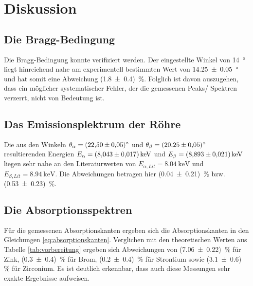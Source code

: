 \section{Diskussion}

\subsection{Die Bragg-Bedingung}
Die Bragg-Bedingung konnte verifiziert werden.
Der eingestellte Winkel von \qty[]{14}{\degree} liegt hinreichend nahe am experimentell bestimmten Wert von \qty{14.25+-0.05}{\degree}
und hat somit eine Abweichung (\num[]{1.8 +- 0.4}) \,\%.
Folglich ist davon auszugehen, dass ein möglicher systematischer Fehler, der die gemessenen Peaks/ Spektren verzerrt, nicht von Bedeutung ist.


\subsection{Das Emissionsplektrum der Röhre}
Die aus den Winkeln $\theta_\alpha = \qty{22.50 \pm 0.05}{\degree}$ und $\theta_\beta = \qty{20.25 \pm 0.05}{\degree}$
 resultierenden Energien $E_\alpha = \qty{8.043 \pm 0.017}{\kilo\eV}$ und $E_\beta  = \qty{8.893 \pm 0.021}{\kilo\eV}$
liegen sehr nahe an den Literaturwerten von $E_{\alpha,Lit} = \qty[]{8.04}{\kilo\electronvolt}$ und
$E_{\beta,Lit} = \qty[]{8.94}{\kilo\electronvolt}$.
Die Abweichungen betragen hier (\num[]{0.04 +- 0.21}) \,\% bzw. (\num[]{0.53 +- 0.23}) \,\%.



\subsection{Die Absorptionsspektren}
Für die gemessenen Absorptionskanten ergeben sich die Absorptionskanten in den Gleichungen \eqref{eq:absorptionskanten}.
Verglichen mit den theoretischen Werten aus Tabelle \ref{tab:vorbereitung} ergeben sich Abweichungen von (\num[]{7.06 +- 0.22}) \,\% für Zink,
(\num[]{0.3 +- 0.4}) \,\% für Brom, (\num[]{0.2 +- 0.4}) \,\% für Strontium sowie (\num[]{3.1 +- 0.6}) \,\% für Zirconium.
Es ist deutlich erkennbar, dass auch diese Messungen sehr exakte Ergebnisse aufweisen.



